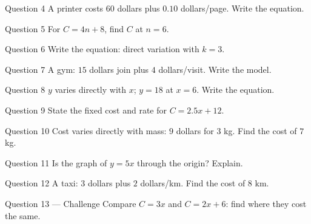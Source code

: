 \documentclass[11pt]{article}
\begin{document}
\begin{qbox}{Question 4}
A printer costs $60$ dollars plus $0.10$ dollars/page. Write the equation.\workspace{2.2cm}
\end{qbox}

\begin{qbox}{Question 5}
For $C=4n+8$, find $C$ at $n=6$.\workspace{2.0cm}
\end{qbox}

\begin{qbox}{Question 6}
Write the equation: direct variation with $k=3$.\workspace{1.8cm}
\end{qbox}

\begin{qbox}{Question 7}
A gym: $15$ dollars join plus $4$ dollars/visit. Write the model.\workspace{2.0cm}
\end{qbox}

\begin{qbox}{Question 8}
$y$ varies directly with $x$; $y=18$ at $x=6$. Write the equation.\workspace{2.0cm}
\end{qbox}

\begin{qbox}{Question 9}
State the fixed cost and rate for $C=2.5x+12$.\workspace{2.0cm}
\end{qbox}

\begin{qbox}{Question 10}
Cost varies directly with mass: $9$ dollars for $3$ kg. Find the cost of $7$ kg.\workspace{2.2cm}
\end{qbox}

\begin{qbox}{Question 11}
Is the graph of $y=5x$ through the origin? Explain.\workspace{2.0cm}
\end{qbox}

\begin{qbox}{Question 12}
A taxi: $3$ dollars plus $2$ dollars/km. Find the cost of $8$ km.\workspace{2.2cm}
\end{qbox}

\begin{qbox}{Question 13 --- Challenge}
Compare $C=3x$ and $C=2x+6$: find where they cost the same.\workspace{2.4cm}
\end{qbox}

\clearpage
{}
\end{document}
